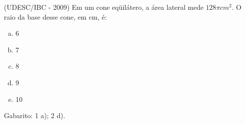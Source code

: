  \begin{exer}
 (UDESC/IBC - 2009) Em um cone eqüilátero, a área lateral mede $128 \pi cm^2$. O raio da base desse cone, em cm, é:
 \begin{enumerate}[a)]
  \item 6
  \item 7
  \item 8
  \item 9
  \item 10
 \end{enumerate}
 \end{exer}

 Gabarito: 1 a); 2 d).

